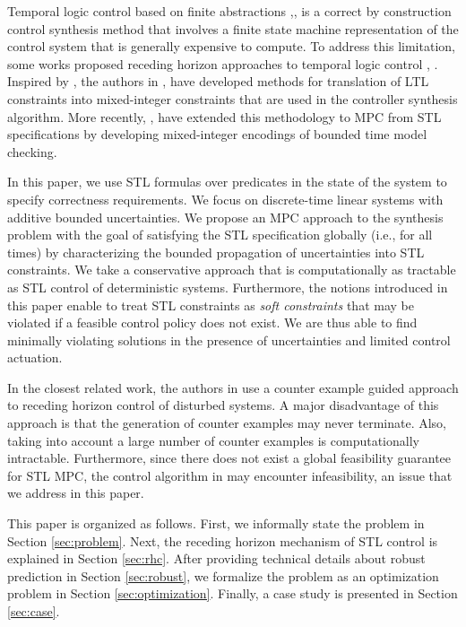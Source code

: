 \documentclass[letterpaper, 10 pt, conference]{ieeeconf}
\begin{document}
Temporal logic control based on finite abstractions \cite{kloetzer2008fully},\cite{kress2009temporal},\cite{tabuada2006linear} is a correct by construction control synthesis method that involves a finite state machine representation of the control system that is generally expensive to compute. To address this limitation, some works proposed receding horizon approaches to temporal logic control  \cite{wongpiromsarn2010receding}, \cite{AydinGol2015}. Inspired by \cite{bemporad1999control}, the authors in \cite{karaman},\cite{wolff2013optimal} have developed methods for translation of LTL constraints into mixed-integer constraints that are used in the controller synthesis algorithm. More recently, \cite{raman}, \cite{raman2015reactive} have extended this methodology to MPC from STL specifications by developing mixed-integer encodings of bounded time model checking.

In this paper, we use STL formulas over predicates in the state of the system to specify correctness requirements. We focus on discrete-time linear systems with additive bounded uncertainties. We propose an MPC approach to the synthesis problem with the goal of satisfying the STL specification globally (i.e., for all times) by characterizing the bounded propagation of uncertainties into STL constraints. We take a conservative approach that is computationally as tractable as STL control of deterministic systems. Furthermore, the notions introduced in this paper enable to treat STL constraints as \emph{soft constraints} that may be violated if a feasible control policy does not exist. We are thus able to find minimally violating solutions in the presence of uncertainties and limited control actuation.

In the closest related work, the authors in \cite{raman2015reactive} use a counter example guided approach to receding horizon control of disturbed systems. A major disadvantage of this approach is that the generation of counter examples may never terminate. Also, taking into account a large number of counter examples is computationally intractable. Furthermore, since there does not exist a global feasibility guarantee for STL MPC, the control algorithm in \cite{raman2015reactive} may encounter infeasibility, an issue that we address in this paper.

This paper is organized as follows. First, we informally state the problem in Section \ref{sec:problem}. Next, the receding horizon mechanism of STL control is explained in Section \ref{sec:rhc}. After providing technical details about robust prediction in Section \ref{sec:robust}, we formalize the problem as an optimization problem in Section \ref{sec:optimization}. Finally, a case study is presented in Section \ref{sec:case}.
\end{document}
